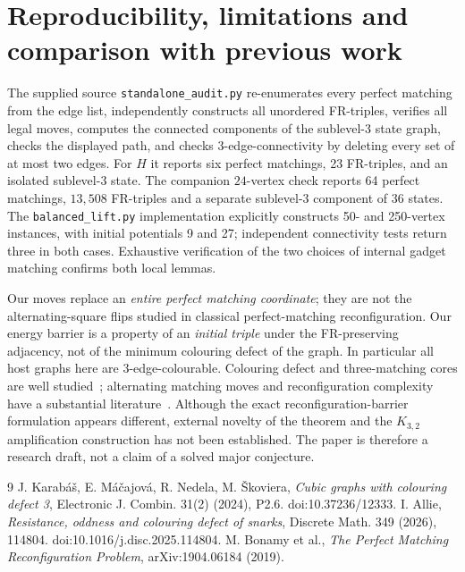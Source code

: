 \documentclass[11pt]{article}
\begin{document}
\section{Reproducibility, limitations and comparison with previous work}
The supplied source \texttt{standalone\_audit.py} re-enumerates every perfect matching from the edge list, independently constructs all unordered FR-triples, verifies all legal moves, computes the connected components of the sublevel-$3$ state graph, checks the displayed path, and checks $3$-edge-connectivity by deleting every set of at most two edges. For $H$ it reports six perfect matchings, 23 FR-triples, and an isolated sublevel-$3$ state. The companion $24$-vertex check reports 64 perfect matchings, $13{,}508$ FR-triples and a separate sublevel-$3$ component of 36 states. The \texttt{balanced\_lift.py} implementation explicitly constructs 50- and 250-vertex instances, with initial potentials 9 and 27; independent connectivity tests return three in both cases. Exhaustive verification of the two choices of internal gadget matching confirms both local lemmas.

Our moves replace an \emph{entire perfect matching coordinate}; they are not the alternating-square flips studied in classical perfect-matching reconfiguration. Our energy barrier is a property of an \emph{initial triple} under the FR-preserving adjacency, not of the minimum colouring defect of the graph. In particular all host graphs here are $3$-edge-colourable. Colouring defect and three-matching cores are well studied~\cite{Karabas2024,Allie2026}; alternating matching moves and reconfiguration complexity have a substantial literature~\cite{Bonamy2019}. Although the exact reconfiguration-barrier formulation appears different, external novelty of the theorem and the $K_{3,2}$ amplification construction has not been established. The paper is therefore a research draft, not a claim of a solved major conjecture.

\begin{thebibliography}{9}\small
{} J. Karab\'a\v{s}, E. M\'a\v{c}ajov\'a, R. Nedela, M. \v{S}koviera, \emph{Cubic graphs with colouring defect 3}, Electronic J. Combin. 31(2) (2024), P2.6. doi:10.37236/12333.
 I. Allie, \emph{Resistance, oddness and colouring defect of snarks}, Discrete Math. 349 (2026), 114804. doi:10.1016/j.disc.2025.114804.
 M. Bonamy et al., \emph{The Perfect Matching Reconfiguration Problem}, arXiv:1904.06184 (2019).
\end{thebibliography}
\end{document}
